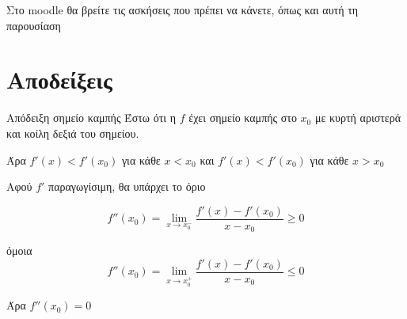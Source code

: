 \documentclass[greek]{beamer}
\begin{document}
\begin{frame}
    Στο moodle θα βρείτε τις ασκήσεις που πρέπει να κάνετε, όπως και αυτή τη παρουσίαση
\end{frame}


\appendix

\section{Αποδείξεις}
\begin{frame}[label=Απόδειξη1]{Απόδειξη σημείο καμπής}
     Έστω ότι η $f$ έχει σημείο καμπής στο $x_0$ με κυρτή αριστερά και κοίλη δεξιά του σημείου.

    Άρα $f'(x)< f'(x_0)$ για κάθε $x<x_0$ και $f'(x)<f'(x_0)$ για κάθε $x>x_0$

     Αφού $f'$ παραγωγίσιμη, θα υπάρχει το όριο

    $$f''(x_0)=\lim\limits_{x \to x_0^-}{ \dfrac{f'(x)-f'(x_0)}{x-x_0} }\ge 0$$

     όμοια
    $$f''(x_0)=\lim\limits_{x \to x_0^+}{ \dfrac{f'(x)-f'(x_0)}{x-x_0} } \le 0$$

     Άρα $f''(x_0)=0$ \hyperlink{Θεώρημα1}{}
\end{frame}
\end{document}
